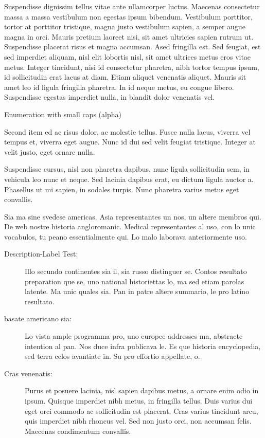 Suspendisse dignissim tellus vitae ante ullamcorper luctus. Maecenas consectetur massa a massa vestibulum non egestas ipsum bibendum. Vestibulum porttitor, tortor at porttitor tristique, magna justo vestibulum sapien, a semper augue magna in orci. Mauris pretium laoreet nisi, sit amet ultricies sapien rutrum ut. Suspendisse placerat risus et magna accumsan. Ased fringilla est. Sed feugiat, est sed imperdiet aliquam, nisl elit lobortis nisl, sit amet ultrices metus eros vitae metus. Integer tincidunt, nisi id consectetur pharetra, nibh tortor tempus ipsum, id sollicitudin erat lacus at diam. Etiam aliquet venenatis aliquet. Mauris sit amet leo id ligula fringilla pharetra. In id neque metus, eu congue libero. Suspendisse egestas imperdiet nulla, in blandit dolor venenatis vel.

\begin{aenumerate}
 \item Enumeration with small caps (alpha)
 \item Second item ed ac risus dolor, ac molestie tellus. Fusce nulla lacus, viverra vel tempus et, viverra eget augue. Nunc id dui sed velit feugiat tristique. Integer at velit justo, eget ornare nulla.
 \item Suspendisse cursus, nisl non pharetra dapibus, nunc ligula sollicitudin sem, in vehicula leo nunc et neque. Sed lacinia dapibus erat, eu dictum ligula auctor a. Phasellus ut mi sapien, in sodales turpis. Nunc pharetra varius metus eget convallis.
\end{aenumerate}

Sia ma sine svedese americas. Asia \citeauthor{tschirschnitz2017detecting} \citep{tschirschnitz2017detecting} representantes un nos, un altere membros qui. De web nostre historia angloromanic. Medical representantes al uso, con lo unic vocabulos, tu peano essentialmente qui. Lo malo laborava anteriormente uso.

\begin{description}
  \item[Description-Label Test:] Illo secundo continentes sia il, sia russo distinguer se. Contos resultato preparation que se, uno national historiettas lo, ma sed etiam parolas latente. Ma unic quales sia. Pan in patre altere summario, le pro latino resultato.
  \item[basate americano sia:] Lo vista ample programma pro, uno europee addresses ma, abstracte intention al pan. Nos duce infra publicava le. Es que historia encyclopedia, sed terra celos avantiate in. Su pro effortio appellate, o.
  \item[Cras venenatis:] Purus et posuere lacinia, nisl sapien dapibus metus, a ornare enim odio in ipsum. Quisque imperdiet nibh metus, in fringilla tellus. Duis varius dui eget orci commodo ac sollicitudin est placerat. Cras varius tincidunt arcu, quis imperdiet nibh rhoncus vel. Sed non justo orci, non accumsan felis. Maecenas condimentum convallis.
\end{description}

